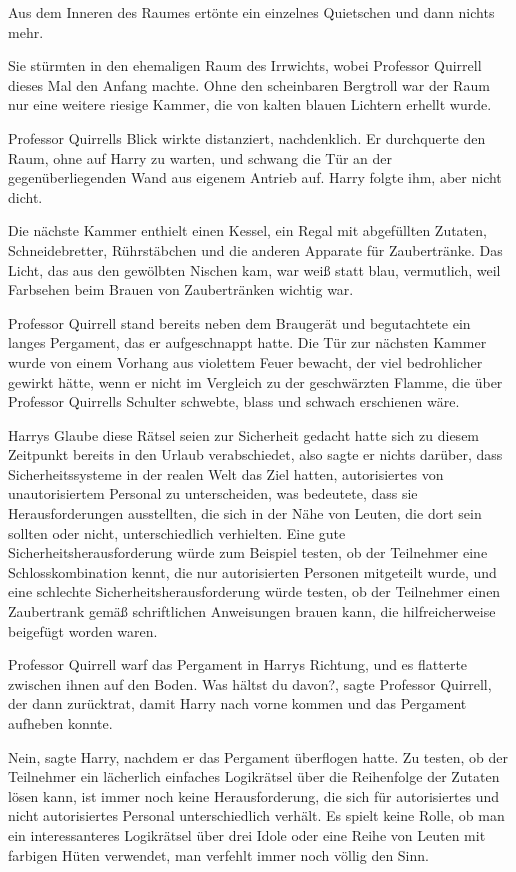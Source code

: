 Aus dem Inneren des Raumes ertönte ein einzelnes Quietschen und dann nichts
mehr.

Sie stürmten in den ehemaligen Raum des Irrwichts, wobei Professor Quirrell
dieses Mal den Anfang machte. Ohne den scheinbaren Bergtroll war der Raum nur
eine weitere riesige Kammer, die von kalten blauen Lichtern erhellt wurde.

Professor Quirrells Blick wirkte distanziert, nachdenklich. Er durchquerte den
Raum, ohne auf Harry zu warten, und schwang die Tür an der gegenüberliegenden
Wand aus eigenem Antrieb auf. Harry folgte ihm, aber nicht dicht.

Die nächste Kammer enthielt einen Kessel, ein Regal mit abgefüllten Zutaten,
Schneidebretter, Rührstäbchen und die anderen Apparate für Zaubertränke. Das
Licht, das aus den gewölbten Nischen kam, war weiß statt blau, vermutlich, weil
Farbsehen beim Brauen von Zaubertränken wichtig war.

Professor Quirrell stand bereits neben dem Braugerät und begutachtete ein langes
Pergament, das er aufgeschnappt hatte. Die Tür zur nächsten Kammer wurde von
einem Vorhang aus violettem Feuer bewacht, der viel bedrohlicher gewirkt hätte,
wenn er nicht im Vergleich zu der geschwärzten Flamme, die über Professor
Quirrells Schulter schwebte, blass und schwach erschienen wäre.

Harrys Glaube diese Rätsel seien zur Sicherheit gedacht hatte sich zu diesem
Zeitpunkt bereits in den Urlaub verabschiedet, also sagte er nichts darüber,
dass Sicherheitssysteme in der realen Welt das Ziel hatten, autorisiertes von
unautorisiertem Personal zu unterscheiden, was bedeutete, dass sie
Herausforderungen ausstellten, die sich in der Nähe von Leuten, die dort sein
sollten oder nicht, unterschiedlich verhielten. Eine gute
Sicherheitsherausforderung würde zum Beispiel testen, ob der Teilnehmer eine
Schlosskombination kennt, die nur autorisierten Personen mitgeteilt wurde, und
eine schlechte Sicherheitsherausforderung würde testen, ob der Teilnehmer einen
Zaubertrank gemäß schriftlichen Anweisungen brauen kann, die hilfreicherweise
beigefügt worden waren.

Professor Quirrell warf das Pergament in Harrys Richtung, und es flatterte
zwischen ihnen auf den Boden. \glqq{}Was hältst du davon?\grqq{}, sagte Professor
Quirrell, der dann zurücktrat, damit Harry nach vorne kommen und das Pergament
aufheben konnte.

\glqq{}Nein\grqq{}, sagte Harry, nachdem er das Pergament überflogen hatte. \glqq{}
Zu testen, ob der Teilnehmer ein lächerlich einfaches Logikrätsel über die
Reihenfolge der Zutaten lösen kann, ist immer noch keine Herausforderung, die
sich für autorisiertes und nicht autorisiertes Personal unterschiedlich verhält.
Es spielt keine Rolle, ob man ein interessanteres Logikrätsel über drei Idole
oder eine Reihe von Leuten mit farbigen Hüten verwendet, man verfehlt immer noch
völlig den Sinn.\grqq{}

